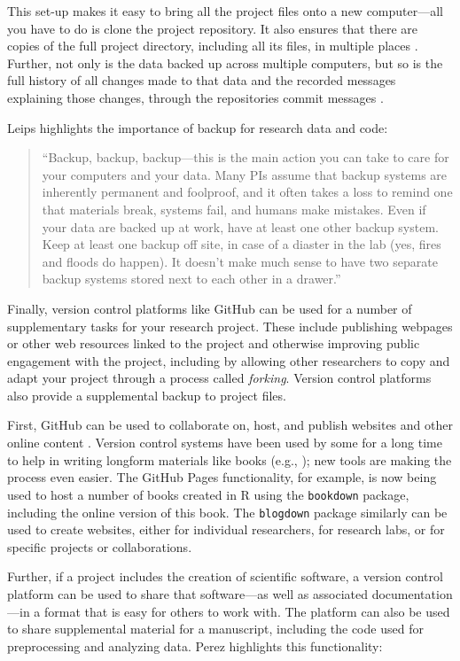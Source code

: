 \documentclass[]{tufte-book}
\begin{document}
This set-up makes it easy to bring all the project files onto a new
computer---all you have to do is clone the project repository. It also ensures
that there are copies of the full project directory, including all its files, in
multiple places \citep{blischak2016quick}. Further, not only is the data backed up
across multiple computers, but so is the full history of all changes made to
that data and the recorded messages explaining those changes, through the
repositories commit messages \citep{perez2016ten}.

Leips highlights the importance of backup for research data and code:

\begin{quote}
``Backup, backup, backup---this is the main action you can take to care for your
computers and your data. Many PIs assume that backup systems are inherently
permanent and foolproof, and it often takes a loss to remind one that
materials break, systems fail, and humans make mistakes. Even if your data
are backed up at work, have at least one other backup system. Keep at least
one backup off site, in case of a diaster in the lab (yes, fires and floods
do happen). It doesn't make much sense to have two separate backup systems stored
next to each other in a drawer.'' \citep{leips2010helm}
\end{quote}

Finally, version control platforms like GitHub can be used for a number
of supplementary tasks for your research project. These include publishing
webpages or other web resources linked to the project and otherwise improving
public engagement with the project, including by allowing other researchers
to copy and adapt your project through a process called \emph{forking}. Version
control platforms also provide a supplemental backup to project files.

First, GitHub can be used to collaborate on, host, and publish websites and
other online content \citep{perez2016ten}. Version control systems have been used by
some for a long time to help in writing longform materials like books (e.g.,
\citep{raymond2003art}); new tools are making the process even easier. The GitHub
Pages functionality, for example, is now being used to host a number of books
created in R using the \texttt{bookdown} package, including the online version of this
book. The \texttt{blogdown} package similarly can be used to create websites, either
for individual researchers, for research labs, or for specific projects or
collaborations.

Further, if a project includes the creation of scientific software, a version
control platform can be used to share that software---as well as associated
documentation---in a format that is easy for others to work with. The platform
can also be used to share supplemental material for a manuscript, including the
code used for preprocessing and analyzing data. Perez highlights this
functionality:
\end{document}
